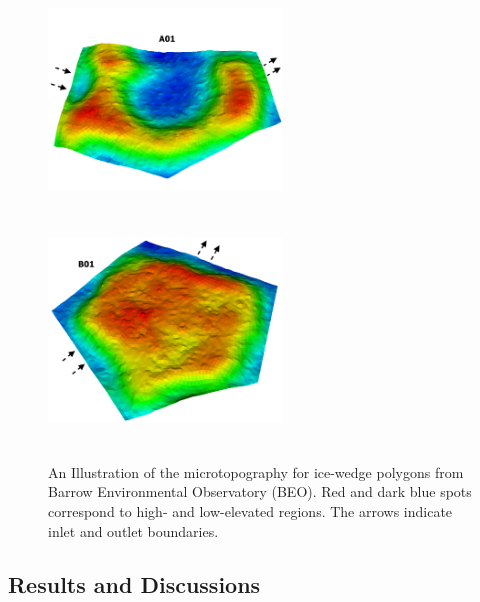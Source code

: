 \documentclass[review,11pt]{elsarticle}
\begin{document}
\begin{figure}[!htb]
\includegraphics[width=6.2cm, height=6cm]{./figures/polygons-finescale/3DpolygonA01-3B.png}
\includegraphics[width=6.2cm, height=6cm]{./figures/polygons-finescale/3DpolygonB01-3B.png}
\caption{An Illustration of the microtopography for ice-wedge polygons from Barrow Environmental Observatory (BEO). Red and dark blue spots correspond to high- and low-elevated regions. The arrows indicate inlet and outlet boundaries.}
\label{IWP-finescale}
\end{figure}
\FloatBarrier
\subsection{Results and Discussions}
\end{document}

